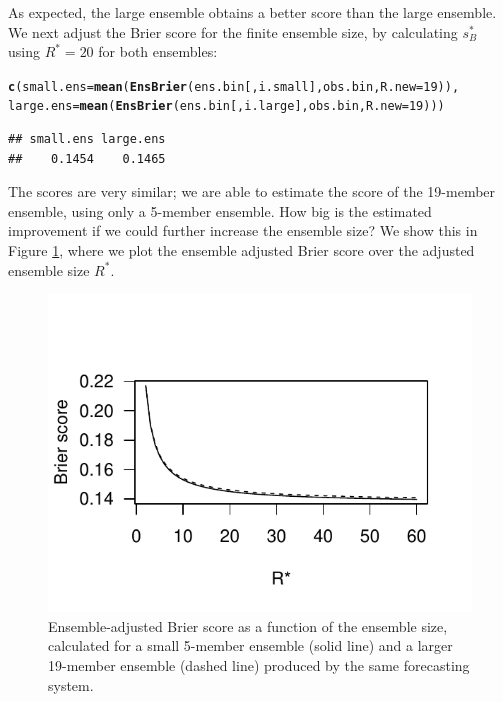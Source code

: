 \documentclass[article]{jss}\usepackage{graphicx, color}
\makeatletter
\def\maxwidth{ %
  \ifdim\Gin@nat@width>\linewidth
    \linewidth
  \else
    \Gin@nat@width
  \fi
}
\newcommand{\hlfunctioncall}[1]{\textcolor[rgb]{0,0.501960784313725,0.752941176470588}{\textbf{#1}}}%
\newenvironment{kframe}{%
 \def\at@end@of@kframe{}%
 \ifinner\ifhmode%
  \def\at@end@of@kframe{\end{minipage}}%
  \begin{minipage}{\columnwidth}%
 \fi\fi%
 \def\FrameCommand##1{\hskip\@totalleftmargin \hskip-\fboxsep
 \colorbox{shadecolor}{##1}\hskip-\fboxsep
     \hskip-\linewidth \hskip-\@totalleftmargin \hskip\columnwidth}%
 \MakeFramed {\advance\hsize-\width
   \@totalleftmargin\z@ \linewidth\hsize
   \@setminipage}}%
 {\par\unskip\endMakeFramed%
 \at@end@of@kframe}
\newenvironment{knitrout}{}{} %
\makeatother
\begin{document}
As expected, the large ensemble obtains a better score than the large ensemble.
We next adjust the Brier score for the finite ensemble size, by calculating $s_{B}^*$ using $R^*=20$ for both ensembles:

\begin{knitrout}
\color{fgcolor}\begin{kframe}
\begin{alltt}
\hlfunctioncall{c}(small.ens=\hlfunctioncall{mean}(\hlfunctioncall{EnsBrier}(ens.bin[, i.small], obs.bin, R.new=19)), 
  large.ens=\hlfunctioncall{mean}(\hlfunctioncall{EnsBrier}(ens.bin[, i.large], obs.bin, R.new=19)))
\end{alltt}
\begin{verbatim}
## small.ens large.ens 
##    0.1454    0.1465
\end{verbatim}
\end{kframe}
\end{knitrout}


The scores are very similar; we are able to estimate the score of the 19-member ensemble, using only a 5-member ensemble.
How big is the estimated improvement if we could further increase the ensemble size?
We show this in Figure \ref{fig:ens-brier}, where we plot the ensemble adjusted Brier score over the adjusted ensemble size $R^*$.


\begin{figure}
\begin{center}
\begin{knitrout}
\color{fgcolor}
\includegraphics[width=\maxwidth]{figure/ens-brier} 

\end{knitrout}

\caption{Ensemble-adjusted Brier score as a function of the ensemble size, calculated for a small 5-member ensemble (solid line) and a larger 19-member ensemble (dashed line) produced by the same forecasting system.}
\label{fig:ens-brier}
\end{center}
\end{figure}
\end{document}
